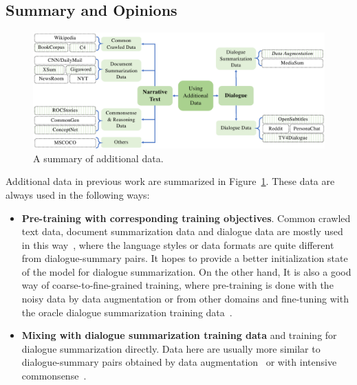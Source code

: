 \subsection{Summary and Opinions}

\begin{figure}
	\centering
	\includegraphics[scale=0.7]{fig/approach-data.pdf}
	\caption{A summary of additional data.}
	\label{fig:app-data}
\end{figure}

Additional data in previous work are summarized in Figure~\ref{fig:app-data}. These data are always used in the following ways:
\begin{itemize}
	\item \textbf{Pre-training with corresponding training objectives}. 
Common crawled text data, document summarization data and dialogue data are 
mostly used in this way~\cite{zou2021low}, where the language styles or data 
formats are quite different from dialogue-summary pairs. It hopes to 
provide a better initialization state of the model for dialogue summarization. 
On the other hand, It is also a good way of coarse-to-fine-grained training, 
where pre-training is done with the noisy data by data augmentation or from other 
domains and fine-tuning with the oracle dialogue summarization training data~\cite{feng2020dialogue,zhu2021mediasum}.


\item \textbf{Mixing with dialogue summarization training data} and 
training for dialogue summarization directly. 
Data here are usually more similar to dialogue-summary pairs obtained by data 
augmentation~\cite{liu2021controllable,khalifa2021bag} or with intensive 
commonsense~\cite{khalifa2021bag,liu2022data}. 
\end{itemize}

